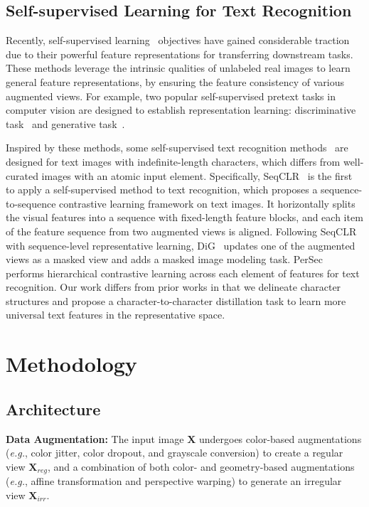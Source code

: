 \documentclass[10pt,twocolumn,letterpaper]{article}
\begin{document}
\subsection{Self-supervised Learning for Text Recognition}
Recently, self-supervised learning~\cite{Dino,SimCLR,IBoT,MAE,MoCo,SimMIM} objectives have gained considerable traction due to their powerful feature representations for transferring downstream tasks. These methods leverage the intrinsic qualities of unlabeled real images to learn general feature representations, by ensuring the feature consistency of various augmented views. 
For example, two popular self-supervised pretext tasks in computer vision are designed to establish representation learning: discriminative task~\cite{seqCLR,MoCo} and generative task~\cite{MAE,SimMIM}. 

Inspired by these methods, some self-supervised text recognition methods~\cite{seqCLR,DiG,Persec,zhang2023relational} are designed for text images with indefinite-length characters, which differs from well-curated images with an atomic input element. 
Specifically, SeqCLR~\cite{seqCLR} is the first to apply a self-supervised method to text recognition, which proposes a sequence-to-sequence contrastive learning framework on text images. It horizontally splits the visual features into a sequence with fixed-length feature blocks, and each item of the feature sequence from two augmented views is aligned. Following SeqCLR with sequence-level representative learning, DiG~\cite{DiG} updates one of the augmented views as a masked view and adds a masked image modeling task.
PerSec~\cite{Persec} performs hierarchical contrastive learning across each element of features for text recognition. 
Our work differs from prior works in that we delineate character structures and propose a character-to-character distillation task to learn more universal text features in the representative space. 

\section{Methodology}

\subsection{Architecture}

\noindent \textbf{Data Augmentation:}
The input image $\mathbf{X}$ undergoes color-based augmentations (\emph{e.g.}, color jitter, color dropout, and grayscale conversion) to create a regular view $\mathbf{X}_{reg}$, and a combination of both color- and geometry-based augmentations (\emph{e.g.}, affine transformation and perspective warping) to generate an irregular view $\mathbf{X}_{irr}$.
\end{document}
